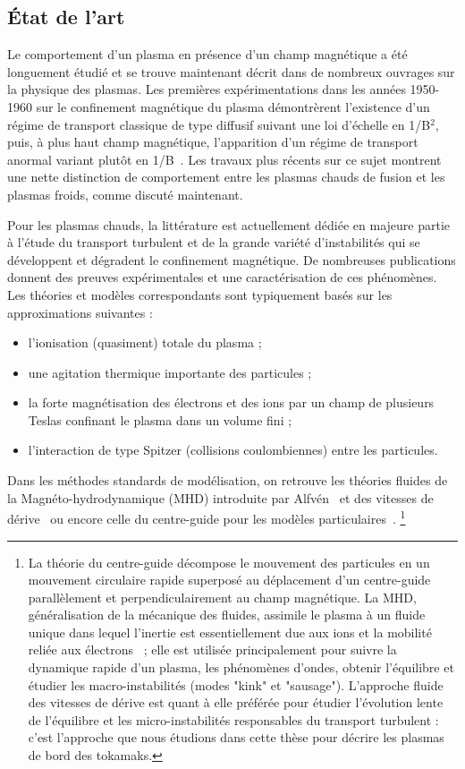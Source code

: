 \begin{refsection}
\section*{État de l'art}
Le comportement d'un plasma en présence d'un champ magnétique a été
longuement étudié et se trouve maintenant décrit dans de nombreux ouvrages sur
la physique des plasmas.
Les premières expérimentations dans les années 1950-1960 sur le confinement
magnétique du plasma démontrèrent l'existence d'un régime de transport classique
de type diffusif suivant une loi d'échelle en 1/B$^2$, puis, à plus haut champ
magnétique, l'apparition d'un régime de transport anormal variant plutôt en
1/B~\parencite{Bohm,Simon55,Yoshikawa,Janes,Rozhansky}. Les travaux plus
récents sur ce sujet montrent une nette distinction de
comportement entre les plasmas chauds de fusion et les plasmas froids, comme
discuté maintenant.

Pour les plasmas chauds, la littérature est actuellement dédiée en majeure
partie à l'étude du transport turbulent et de la grande variété d'instabilités qui
se développent et dégradent le confinement magnétique. De nombreuses
publications donnent des preuves expérimentales et une caractérisation de ces
phénomènes. Les théories et modèles correspondants sont typiquement basés sur
les approximations suivantes :

\begin{itemize}
  \item l'ionisation (quasiment) totale du plasma ;
  \item une agitation thermique importante des particules ;
  \item la forte magnétisation des électrons et des ions par un champ de
  plusieurs Teslas confinant le plasma dans un volume fini ;
  \item l'interaction de type Spitzer (collisions coulombiennes) entre les
  particules.
\end{itemize}

Dans les méthodes standards de modélisation, on retrouve les théories fluides de
la Magnéto-hydrodynamique
 (MHD) introduite
par Alfvén~\parencite{Alfven} et des vitesses de dérive~\parencite{SarazinPhD}
ou encore celle du centre-guide pour les modèles
particulaires~\parencite{Taylor,Lee,Garbet10}.
\footnote{La
théorie du centre-guide décompose le mouvement des particules en un mouvement
circulaire rapide superposé au déplacement d'un centre-guide parallèlement et
perpendiculairement au champ magnétique. La MHD, généralisation de la mécanique
des fluides, assimile le plasma à un fluide unique dans lequel l'inertie est
essentiellement due aux ions et la mobilité reliée aux
électrons~\parencite{Rax} ; elle est utilisée principalement pour suivre
la dynamique rapide d'un plasma, les phénomènes d'ondes, obtenir l'équilibre et
 étudier les macro-instabilités (modes "kink" et "sausage").
L'approche fluide des vitesses de dérive est quant à elle préférée pour étudier
l'évolution lente de l'équilibre et les micro-instabilités responsables du
transport turbulent : c'est l'approche que nous étudions dans cette thèse pour décrire les plasmas de bord des tokamaks.}


\end{refsection}
